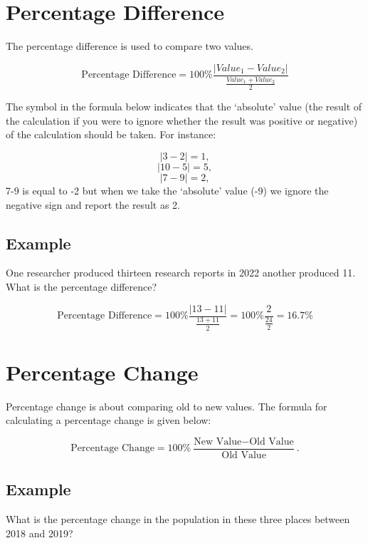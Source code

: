 \documentclass[
]{book}
\begin{document}
\hypertarget{percentage-difference}{%
\section{Percentage Difference}\label{percentage-difference}}

The percentage difference is used to compare two values.

\[ \textrm{Percentage Difference} = 100\% \frac{|Value_1 - Value_2|}{\frac{Value_1+Value_2}{2}}\]

The \textbar{} symbol in the formula below indicates that the `absolute' value (the result of the calculation if you were to ignore whether the result was positive or negative) of the calculation should be taken. For instance:

\[ |3 - 2| = 1,\]
\[ |10 - 5| = 5,\]
\[ |7 - 9| = 2,\]
7-9 is equal to -2 but when we take the `absolute' value (-9\textbar) we ignore the negative sign and report the result as 2.

\hypertarget{example-10}{%
\subsection{Example}\label{example-10}}

One researcher produced thirteen research reports in 2022 another produced 11. What is the percentage difference?

\[ \textrm{Percentage Difference} = 100\% \frac{|13 - 11|}{\frac{13+11}{2}}=100\% \frac{2}{\frac{24}{2}}=16.7\%\]

\hypertarget{percentage-change}{%
\section{Percentage Change}\label{percentage-change}}

Percentage change is about comparing old to new values. The formula for calculating a percentage change is given below:

\[ \textrm{Percentage Change} = 100\% \frac{\textrm{New Value} - \textrm{Old Value}}{\textrm{Old Value}}.\]

\hypertarget{example-11}{%
\subsection{Example}\label{example-11}}

What is the percentage change in the population in these three places between 2018 and 2019?
\end{document}
